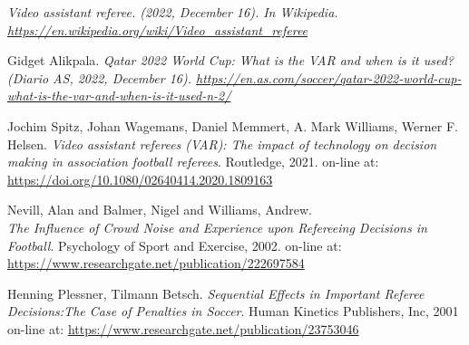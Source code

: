 \documentclass[a4paper]{article}
\begin{document}
\begin{thebibliography}{9}

 \em{Video assistant referee}. (2022, December 16). In Wikipedia. \url{https://en.wikipedia.org/wiki/Video_assistant_referee}  

 Gidget Alikpala. \em{Qatar 2022 World Cup: What is the VAR and when is it used?} (Diario AS, 2022, December 16). \url{https://en.as.com/soccer/qatar-2022-world-cup-what-is-the-var-and-when-is-it-used-n-2/}

 Jochim Spitz, Johan Wagemans, Daniel Memmert, A. Mark Williams, Werner F. Helsen. \emph{Video assistant referees (VAR): The impact of technology on decision making in association football referees}. Routledge, 2021. on-line at: \url{https://doi.org/10.1080/02640414.2020.1809163}

 Nevill, Alan and Balmer, Nigel and Williams, Andrew. \\ \emph{The Influence of Crowd Noise and Experience upon Refereeing Decisions in Football}. Psychology of Sport and Exercise, 2002. on-line at: \url{https://www.researchgate.net/publication/222697584}

 Henning Plessner, Tilmann Betsch. \emph{Sequential Effects in Important Referee Decisions:The Case of Penalties in Soccer}. Human Kinetics Publishers, Inc, 2001 on-line at: \url{https://www.researchgate.net/publication/23753046}


\end{thebibliography}
\end{document}
